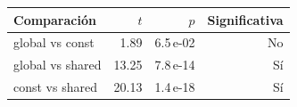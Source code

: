 \begin{tabular}{lrrr}
\toprule
Comparación & $t$ & $p$ & Significativa \\
\midrule
global vs const & 1.89 & 6.5\,e-02 & No \\
global vs shared & 13.25 & 7.8\,e-14 & Sí \\
const vs shared & 20.13 & 1.4\,e-18 & Sí \\
\bottomrule
\end{tabular}
